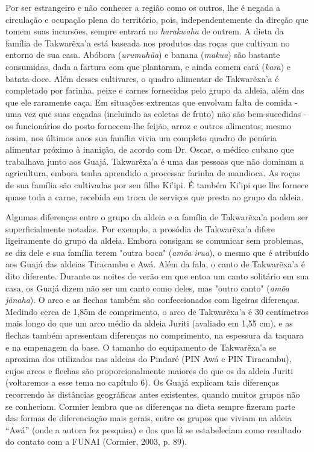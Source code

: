 Por ser estrangeiro e não conhecer a região como os outros, lhe é negada
a circulação e ocupação plena do território, pois, independentemente da
direção que tomem suas incursões, sempre entrará no \emph{harakwaha} de
outrem. A dieta da família de Takwarẽxa'a está baseada nos produtos das
roças que cultivam no entorno de sua casa. Abóbora (\emph{urumuhũa}) e
banana (\emph{makua}) são bastante consumidas, dada a fartura com que
plantaram, e ainda comem cará (\emph{kara}) e batata-doce. Além desses
cultivares, o quadro alimentar de Takwarẽxa'a é completado por farinha,
peixe e carnes fornecidas pelo grupo da aldeia, além das que ele
raramente caça. Em situações extremas que envolvam falta de comida - uma
vez que suas caçadas (incluindo as coletas de fruto) não são
bem-sucedidas - os funcionários do posto fornecem-lhe feijão, arroz e
outros alimentos; mesmo assim, nos últimos anos sua família vivia um
completo quadro de penúria alimentar próximo à inanição, de acordo com
Dr. Oscar, o médico cubano que trabalhava junto aos Guajá. Takwarẽxa'a é
uma das pessoas que não dominam a agricultura, embora tenha aprendido a
processar farinha de mandioca. As roças de sua família são cultivadas
por seu filho Ki'ipi. É também Ki'ipi que lhe fornece quase toda a
carne, recebida em troca de serviços que presta ao grupo da aldeia.

Algumas diferenças entre o grupo da aldeia e a família de Takwarẽxa'a
podem ser superficialmente notadas. Por exemplo, a prosódia de
Takwarẽxa'a difere ligeiramente do grupo da aldeia. Embora consigam se
comunicar sem problemas, se diz dele e sua família terem "outra boca"
(\emph{amõa} \emph{irua}), o mesmo que é atribuído aos Guajá das aldeias
Tiracambu e Awá. Além da fala, o canto de Takwarẽxa'a é dito diferente.
Durante as noites de verão em que entoa um canto solitário em sua casa,
os Guajá dizem não ser um canto como deles, mas "outro canto"
(\emph{amõa jãnaha}). O arco e as flechas também são confeccionados com
ligeiras diferenças. Medindo cerca de 1,85m de comprimento, o arco de
Takwarẽxa'a é 30 centímetros mais longo do que um arco médio da aldeia
Juriti (avaliado em 1,55 cm), e as flechas também apresentam diferenças
no comprimento, na espessura da taquara e na empenagem da base. O
tamanho do equipamento de Takwarẽxa'a se aproxima dos utilizados nas
aldeias do Pindaré (PIN Awá e PIN Tiracambu), cujos arcos e flechas são
proporcionalmente maiores do que os da aldeia Juriti (voltaremos a esse
tema no capítulo 6). Os Guajá explicam tais diferenças recorrendo às
distâncias geográficas antes existentes, quando muitos grupos não se
conheciam. Cormier lembra que as diferenças na dieta sempre fizeram
parte das formas de diferenciação mais gerais, entre os grupos que
viviam na aldeia ``Awá'' (onde a autora fez pesquisa) e dos que lá se
estabeleciam como resultado do contato com a FUNAI (Cormier, 2003, p.
89).

